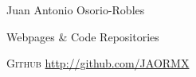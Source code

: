 \documentclass[english,11pt,letterpaper]{article}
\begin{document}
\begin{cv}{Juan Antonio Osorio-Robles}
	\begin{cvlist}{Webpages \& Code Repositories}
        \item [\textsc{Github}]
            \href{http://github.com/JAORMX}{http://github.com/JAORMX}
	\end{cvlist}

\end{cv}
\end{document}
